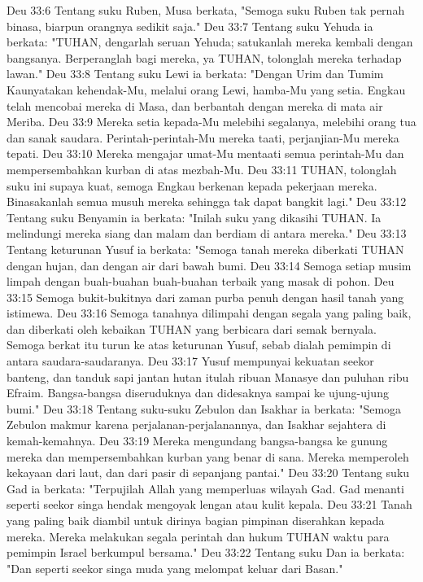 Deu 33:6  Tentang suku Ruben, Musa berkata, "Semoga suku Ruben tak pernah binasa, biarpun orangnya sedikit saja."
Deu 33:7  Tentang suku Yehuda ia berkata: "TUHAN, dengarlah seruan Yehuda; satukanlah mereka kembali dengan bangsanya. Berperanglah bagi mereka, ya TUHAN, tolonglah mereka terhadap lawan."
Deu 33:8  Tentang suku Lewi ia berkata: "Dengan Urim dan Tumim Kaunyatakan kehendak-Mu, melalui orang Lewi, hamba-Mu yang setia. Engkau telah mencobai mereka di Masa, dan berbantah dengan mereka di mata air Meriba.
Deu 33:9  Mereka setia kepada-Mu melebihi segalanya, melebihi orang tua dan sanak saudara. Perintah-perintah-Mu mereka taati, perjanjian-Mu mereka tepati.
Deu 33:10  Mereka mengajar umat-Mu mentaati semua perintah-Mu dan mempersembahkan kurban di atas mezbah-Mu.
Deu 33:11  TUHAN, tolonglah suku ini supaya kuat, semoga Engkau berkenan kepada pekerjaan mereka. Binasakanlah semua musuh mereka sehingga tak dapat bangkit lagi."
Deu 33:12  Tentang suku Benyamin ia berkata: "Inilah suku yang dikasihi TUHAN. Ia melindungi mereka siang dan malam dan berdiam di antara mereka."
Deu 33:13  Tentang keturunan Yusuf ia berkata: "Semoga tanah mereka diberkati TUHAN dengan hujan, dan dengan air dari bawah bumi.
Deu 33:14  Semoga setiap musim limpah dengan buah-buahan buah-buahan terbaik yang masak di pohon.
Deu 33:15  Semoga bukit-bukitnya dari zaman purba penuh dengan hasil tanah yang istimewa.
Deu 33:16  Semoga tanahnya dilimpahi dengan segala yang paling baik, dan diberkati oleh kebaikan TUHAN yang berbicara dari semak bernyala. Semoga berkat itu turun ke atas keturunan Yusuf, sebab dialah pemimpin di antara saudara-saudaranya.
Deu 33:17  Yusuf mempunyai kekuatan seekor banteng, dan tanduk sapi jantan hutan itulah ribuan Manasye dan puluhan ribu Efraim. Bangsa-bangsa diseruduknya dan didesaknya sampai ke ujung-ujung bumi."
Deu 33:18  Tentang suku-suku Zebulon dan Isakhar ia berkata: "Semoga Zebulon makmur karena perjalanan-perjalanannya, dan Isakhar sejahtera di kemah-kemahnya.
Deu 33:19  Mereka mengundang bangsa-bangsa ke gunung mereka dan mempersembahkan kurban yang benar di sana. Mereka memperoleh kekayaan dari laut, dan dari pasir di sepanjang pantai."
Deu 33:20  Tentang suku Gad ia berkata: "Terpujilah Allah yang memperluas wilayah Gad. Gad menanti seperti seekor singa hendak mengoyak lengan atau kulit kepala.
Deu 33:21  Tanah yang paling baik diambil untuk dirinya bagian pimpinan diserahkan kepada mereka. Mereka melakukan segala perintah dan hukum TUHAN waktu para pemimpin Israel berkumpul bersama."
Deu 33:22  Tentang suku Dan ia berkata: "Dan seperti seekor singa muda yang melompat keluar dari Basan."
